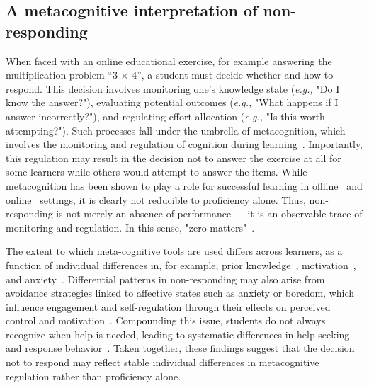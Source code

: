 \documentclass[12pt]{article}
\begin{document}
\subsection{A metacognitive interpretation of non-responding} %
When faced with an online educational exercise, for example answering the multiplication problem ``3 $\times$ 4'', a student must decide whether and how to respond. This decision involves monitoring one's knowledge state (\textit{e.g.,} "Do I know the answer?"), evaluating potential outcomes (\textit{e.g.,} "What happens if I answer incorrectly?"), and regulating effort allocation (\textit{e.g.,} "Is this worth attempting?"). Such processes fall under the umbrella of metacognition, which involves the monitoring and regulation of cognition during learning~\parencite{winne2017cognition}. Importantly, this regulation may result in the decision not to answer the exercise at all for some learners while others would attempt to answer the items. While metacognition has been shown to play a role for successful learning in offline~\parencite{rabinowitz2017nteraction, fleur2021metacognition, colantonio2024predicting} and online~\parencite{zhao2020time, kim2009not, fidan2024emotions, shields2024active} settings, it is clearly not reducible to proficiency alone. Thus, non-responding is not merely an absence of performance --- it is an observable trace of monitoring and regulation. In this sense, "zero matters"~\parencite[p.~2]{van2025statistical}. 

The extent to which meta-cognitive tools are used differs across learners, as a function of individual differences in, for example, prior knowledge~\parencite{taub2014can}, motivation~\parencite{sungur2007modeling, karlen2016differences}, and anxiety~\parencite{matthews1999metacognition, wells1995metacognition}. Differential patterns in non-responding may also arise from avoidance strategies linked to affective states such as anxiety or boredom, which influence engagement and self-regulation through their effects on perceived control and motivation~\parencite{pekrun2013control}. Compounding this issue, students do not always recognize when help is needed, leading to systematic differences in help-seeking and response behavior~\parencite{aleven2000limitations}. Taken together, these findings suggest that the decision not to respond may reflect stable individual differences in metacognitive regulation rather than proficiency alone. %
\end{document}
